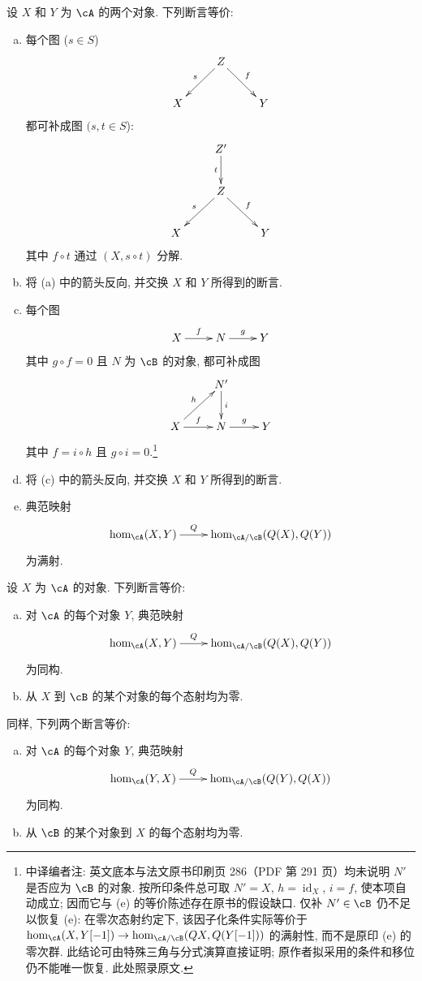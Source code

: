 \begin{proposition}\label{VIII:2-5-2}
设 $X$ 和 $Y$ 为 $\cA$ 的两个对象. 下列断言等价:
\begin{enumerate}[(a)]
  \item 每个图 ($s\in S$)
    \[\xymatrix{
      & Z \ar[dl]_-s \ar[dr]^-f \\
      X
        & & Y
    }\]
    都可补成图 $(s,t\in S$):
    \[\xymatrix{
      & Z' \ar[d]_-t \\
      & Z \ar[dl]_-s \ar[dr]^-f \\
      X
        & & Y
    }\]
    其中 $f\circ t$ 通过 $(X,s\circ t)$ 分解.
  \item 将 (a) 中的箭头反向, 并交换 $X$ 和 $Y$ 所得到的断言.
  \item 每个图
    \[\xymatrix{
      X \ar[r]^-f
        & N \ar[r]^-g
        & Y
    }\]
    其中 $g\circ f=0$ 且 $N$ 为 $\cB$ 的对象, 都可补成图
    \[\xymatrix{
      & N' \ar[d]^-i \\
      X \ar[ur]^-h \ar[r]^-f
        & N \ar[r]^-g
        & Y
    }\]
    其中 $f=i\circ h$ 且 $g\circ i=0$.\footnote{中译编者注: 英文底本与法文原书印刷页 286（PDF 第 291 页）均未说明 $N'$ 是否应为 $\cB$ 的对象. 按所印条件总可取 $N'=X$, $h=\operatorname{id}_X$, $i=f$, 使本项自动成立; 因而它与 (e) 的等价陈述存在原书的假设缺口. 仅补 $N'\in\cB$ 仍不足以恢复 (e): 在零次态射约定下, 该因子化条件实际等价于 $\hom_{\cA}(X,Y[-1])\to\hom_{\cA/\cB}(QX,Q(Y[-1]))$ 的满射性, 而不是原印 (e) 的零次群. 此结论可由特殊三角与分式演算直接证明; 原作者拟采用的条件和移位仍不能唯一恢复. 此处照录原文.}
  \item 将 (c) 中的箭头反向, 并交换 $X$ 和 $Y$ 所得到的断言.
  \item 典范映射
    \[\xymatrix{
      \hom_\cA(X,Y) \ar[r]^-Q
        & \hom_{\cA/\cB}(Q(X),Q(Y))
    }\]
    为满射.
\end{enumerate}
\end{proposition}

\begin{proposition}\label{VIII:2-5-3}
设 $X$ 为 $\cA$ 的对象. 下列断言等价:
\begin{enumerate}[(a)]
  \item 对 $\cA$ 的每个对象 $Y$, 典范映射
    \[\xymatrix{
      \hom_\cA(X,Y) \ar[r]^-Q
        & \hom_{\cA/\cB}(Q(X),Q(Y))
    }\]
    为同构.
  \item 从 $X$ 到 $\cB$ 的某个对象的每个态射均为零.
\end{enumerate}
同样, 下列两个断言等价:
\begin{enumerate}[(a)']
  \item 对 $\cA$ 的每个对象 $Y$, 典范映射
    \[\xymatrix{
      \hom_\cA(Y,X) \ar[r]^-Q
        & \hom_{\cA/\cB}(Q(Y),Q(X))
    }\]
    为同构.
  \item 从 $\cB$ 的某个对象到 $X$ 的每个态射均为零.
\end{enumerate}
\end{proposition}

